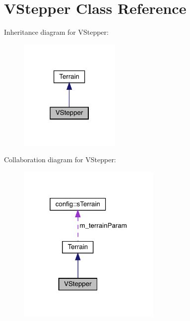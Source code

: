 \hypertarget{class_v_stepper}{}\section{V\+Stepper Class Reference}
\label{class_v_stepper}


Inheritance diagram for V\+Stepper\+:\nopagebreak
\begin{figure}[H]
\begin{center}
\leavevmode
\includegraphics[width=138pt]{class_v_stepper__inherit__graph}
\end{center}
\end{figure}


Collaboration diagram for V\+Stepper\+:\nopagebreak
\begin{figure}[H]
\begin{center}
\leavevmode
\includegraphics[width=196pt]{class_v_stepper__coll__graph}
\end{center}
\end{figure}
